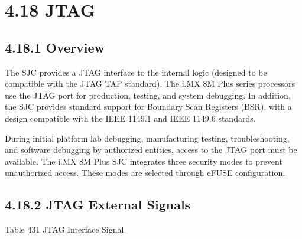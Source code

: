 \documentclass[letterpaper,10pt,openany,english]{sphinxmanual}
\begin{document}
\section{4.18 JTAG}
\label{\detokenize{hardware:jtag}}

\subsection{4.18.1 Overview}
\label{\detokenize{hardware:id23}}
\sphinxAtStartPar
The SJC provides a JTAG interface to the internal logic (designed to be compatible with the JTAG TAP standard). The i.MX 8M Plus series processors use the JTAG port for production, testing, and system debugging. In addition, the SJC provides standard support for Boundary Scan Registers (BSR), with a design compatible with the IEEE 1149.1 and IEEE 1149.6 standards.

\sphinxAtStartPar
During initial platform lab debugging, manufacturing testing, troubleshooting, and software debugging by authorized entities, access to the JTAG port must be available. The i.MX 8M Plus SJC integrates three security modes to prevent unauthorized access. These modes are selected through eFUSE configuration.


\subsection{4.18.2 JTAG External Signals}
\label{\detokenize{hardware:jtag-external-signals}}
\sphinxAtStartPar
Table 4\sphinxhyphen{}31 JTAG Interface Signal
\end{document}
